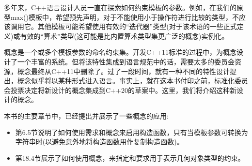 多年来，C++语言设计人员一直在探索如何约束模板的参数。例如，在我们的原型max()模板中，希望预先声明，对于不能使用小于操作符进行比较的类型，不应该调用它。其他模板可能希望使用有效的“迭代器”类型(对于该术语的一些正式定义)或有效的“算术”类型(这可能是比内置算术类型集更广泛的概念)实例化。

概念是一个或多个模板参数的命名约束集。开发C++11标准的过程中，为概念设计了一个丰富的系统。但将该特性集成到语言规范中的话，需要太多的委员会资源，概念最终从C++11中删除了。过了一段时间，就有一种不同的特性设计提出，概念似乎将以某种形式进入语言。事实上，就在这本书付印之前，标准化委员会投票决定将新设计的概念集成到C++20的草案中。这里，我们将介绍这种新设计的概念。

本书的主要章节中，已经提出并展示了一些概念的应用:

\begin{itemize}
\item 
第6.5节说明了如何使用需求和概念来启用构造函数，只有当模板参数可转换为字符串时(以避免意外地将构造函数用作复制构造函数)。

\item 
第18.4节展示了如何使用概念，来指定和要求用于表示几何对象类型的约束。
\end{itemize}